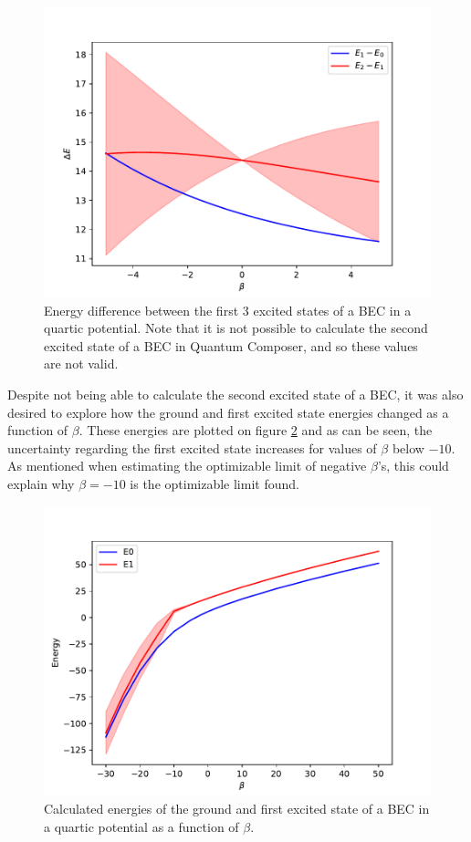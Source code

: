 \documentclass[aps,pra,reprint,superscriptaddress]{revtex4-1}
\begin{document}
\begin{figure}
	\includegraphics[width=\columnwidth]{graphics/energydiff.pdf}
	\caption{Energy difference between the first 3 excited states of a BEC in a quartic potential. Note that it is not possible to calculate the second excited state of a BEC in Quantum Composer, and so these values are not valid.}
	\label{fig:energyDiff}
\end{figure}

Despite not being able to calculate the second excited state of a BEC, it was also desired to explore how the ground and first excited state energies changed as a function of $\beta$. These energies are plotted on figure \ref{fig:energyLevels} and as can be seen, the uncertainty regarding the first excited state increases for values of $\beta$ below $-10$. As mentioned when estimating the optimizable limit of negative $\beta$'s, this could explain why $\beta=-10$ is the optimizable limit found.\\

\begin{figure}
	\includegraphics[width=\columnwidth]{graphics/energylevels.pdf}
	\caption{Calculated energies of the ground and first excited state of a BEC in a quartic potential as a function of $\beta$.}
	\label{fig:energyLevels}
\end{figure}
\end{document}
